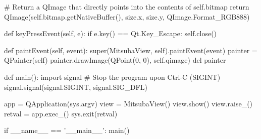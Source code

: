 \begin{python}
        # Return a QImage that directly points into the contents of self.bitmap
        return QImage(self.bitmap.getNativeBuffer(),
            size.x, size.y, QImage.Format_RGB888)

    def keyPressEvent(self, e):
        if e.key() == Qt.Key_Escape:
            self.close()

    def paintEvent(self, event):
        super(MitsubaView, self).paintEvent(event)
        painter = QPainter(self)
        painter.drawImage(QPoint(0, 0), self.qimage)
        del painter

def main():
    import signal
    # Stop the program upon Ctrl-C (SIGINT)
    signal.signal(signal.SIGINT, signal.SIG_DFL)

    app = QApplication(sys.argv)
    view = MitsubaView()
    view.show()
    view.raise_()
    retval = app.exec_()
    sys.exit(retval)

if __name__ == '__main__':
    main()
\end{python}

